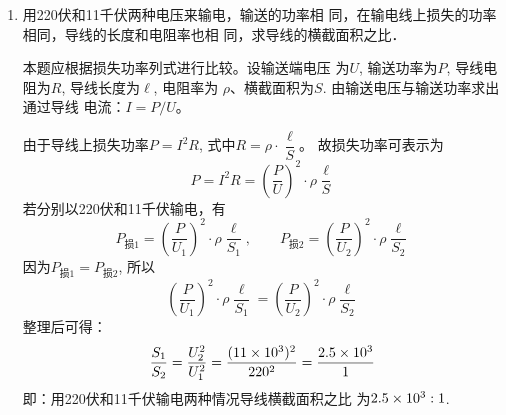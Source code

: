 \begin{enumerate}
\item 用220伏和11千伏两种电压来输电，输送的功率相
同，在输电线上损失的功率相同，导线的长度和电阻率也相
同，求导线的横截面积之比．

\begin{solution}
本题应根据损失功率列式进行比较。设输送端电压
为$U$, 输送功率为$P$, 导线电阻为$R$, 导线长度为$\ell$, 电阻率为
$\rho$、横截面积为$S$. 由输送电压与输送功率求出通过导线
电流：$I=P/U$。

由于导线上损失功率$P=I^2R$, 式中$R=\rho\cdot\dfrac{\ell}{S}$。
故损失功率可表示为
\[P=I^2R=\left(\frac{P}{U}\right)^2\cdot \rho\frac{\ell}{S}\]
若分别以220伏和11千伏输电，有
\[P_{\text{损1}}=\left(\frac{P}{U_1}\right)^2\cdot \rho\frac{\ell}{S_1},\qquad P_{\text{损2}}=\left(\frac{P}{U_2}\right)^2\cdot \rho\frac{\ell}{S_2}\]
因为$P_{\text{损1}}=P_{\text{损2}}$, 所以
\[\left(\frac{P}{U_1}\right)^2\cdot \rho\frac{\ell}{S_1}=\left(\frac{P}{U_2}\right)^2\cdot \rho\frac{\ell}{S_2}\]
整理后可得：
\[\frac{S_1}{S_2}=\frac{U^2_2}{U^2_1}=\frac{(11\times 10^3)^2}{220^2}=\frac{2.5\times 10^3}{1}\]
即：用220伏和11千伏输电两种情况导线横截面积之比
为$2.5\times10^3:1$.
\end{solution}

\end{enumerate}




